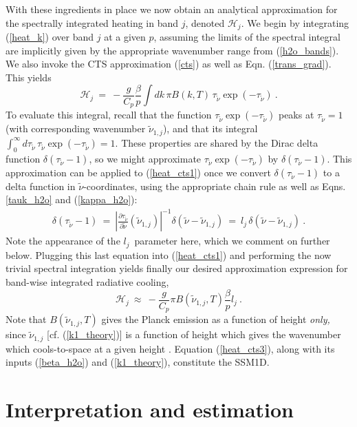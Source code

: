 \documentclass{ametsoc}
\newcommand{\beqn}{\begin{equation}}
\newcommand{\eeqn}{\end{equation}}
\newcommand{\eqnref}[1]{(\ref{#1})}
\newcommand{\inverse}{^{-1}}
\newcommand{\partialder}[2]{\ensuremath{\frac{\partial #1}{\partial #2}}}
\newcommand{\Cp}{\ensuremath{C_p}}
\newcommand{\wv}{\ensuremath{\widetilde{\nu}}}
\newcommand{\ch}{\ensuremath{\mathcal{H}}}
\newcommand{\lj}{\ensuremath{l_j}}
\newcommand{\tauk}{\ensuremath{\tau_{\wv}}}
\newcommand{\konej}{\ensuremath{\wv_{1,j}}}
\begin{document}
With these ingredients in place  we now obtain an analytical approximation for the spectrally integrated heating in band $j$, denoted $\ch_j$. We begin by integrating \eqnref{heat_k}  over band $j$ at a given $p$, assuming the limits of the spectral integral are implicitly given by  the appropriate wavenumber range from \eqnref{h2o_bands}. We also  invoke the CTS approximation \eqnref{cts} as well as Eqn.  \eqnref{trans_grad}. This yields
 \beqn
\ch_j \ =   \ -  \frac{g}{\Cp}\frac{\beta}{p}\int dk\,  \pi B(k,T)\, \tauk \exp(-\tauk) \ .
	\label{heat_cts1}
\eeqn
 To evaluate this integral, recall that the function $\tauk\exp(-\tauk)$ peaks at $\tauk=1$ (with corresponding wavenumber $\konej$), and that its integral $\int_0^\infty d\tauk\,\tauk\exp(-\tauk)=1$.  These properties are shared by the Dirac delta function $\delta(\tauk -1)$, so we might approximate $\tauk\exp(-\tauk)$ by $\delta(\tauk -1)$. This approximation can be applied to \eqnref{heat_cts1} once we convert $\delta(\tauk -1)$ to a delta function in \wv-coordinates, using the appropriate chain rule \citep[e.g.][]{gasiorowicz2003} as well as Eqns. \eqref{tauk_h2o} and \eqnref{kappa_h2o}:
    \begin{align*}
               \delta(\tauk- 1) \ = \ \left|\partialder{\tauk}{\wv}(\konej)\right|\inverse\!\!\delta(\wv-\konej) \ = \ \lj\,  \delta(\wv-\konej)  \ .
      \end{align*}
Note the appearance of the \lj\ parameter here, which we comment on further below. Plugging this last equation into \eqnref{heat_cts1} and performing the now trivial spectral integration yields finally our desired approximation expression for band-wise integrated radiative cooling,
\beqn
		\ch_j  \ \approx \ - \frac{g}{\Cp}\pi B(\konej,T)\frac{\beta}{p} \lj \ .
	\label{heat_cts3}
\eeqn
Note that $B(\konej,T)$ gives the Planck emission as a function of height \emph{only,} since $\konej$ [cf. \eqnref{k1_theory}] is a function of height which gives the wavenumber which cools-to-space at a given height . Equation \eqnref{heat_cts3}, along with its inputs \eqnref{beta_h2o} and \eqnref{k1_theory}, constitute the SSM1D.  

 \section{Interpretation and estimation} \label{sec_interpretation}

\end{document}
